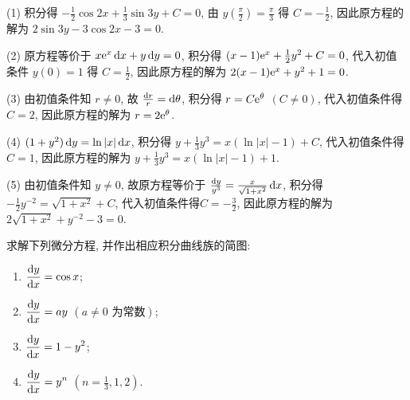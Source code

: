 \begin{solve}
  (1) 积分得 $-\frac{1}{2}\cos2x+\frac{1}{3}\sin3y+C=0$, 
  由 $y\left(\frac{\pi}{2}\right)=\frac{\pi}{3}$ 得 $C=-\frac{1}{2}$,
  因此原方程的解为 $2\sin3y-3\cos2x-3=0$.

  (2) 原方程等价于 $x\mathrm{e}^x\mathop{}\!\mathrm{d} x+y\mathop{}\!\mathrm{d} y=0$, 积分得 $(x-1)\mathrm{e}^x+\frac{1}{2}y^2+C=0$, 
  代入初值条件 $y(0)=1$ 得 $C=\frac{1}{2}$, 因此原方程的解为 $2(x-1)\mathrm{e}^x+y^2+1=0$.

  (3) 由初值条件知 $r\neq0$, 故 $\frac{\mathop{}\!\mathrm{d} r}{r}=\mathop{}\!\mathrm{d}\theta$, 积分得 $r=C\mathrm{e}^{\theta}$ $(C\neq 0)$,
  代入初值条件得 $C=2$, 因此原方程的解为 $r=2\mathrm{e}^{\theta}$.

  (4) $(1+y^2)\mathop{}\!\mathrm{d} y=\ln|x|\mathop{}\!\mathrm{d} x$, 积分得 $y+\frac{1}{3}y^3=x(\ln|x|-1)+C$, 
  代入初值条件得$C=1$, 因此原方程的解为 $y+\frac{1}{3}y^3=x(\ln|x|-1)+1$.

  (5) 由初值条件知 $y\neq0$, 故原方程等价于 $\frac{\mathop{}\!\mathrm{d} y}{y^3}=\frac{x}{\sqrt{1+x^2}}\mathop{}\!\mathrm{d} x$, 
  积分得 $-\frac{1}{2}y^{-2}=\sqrt{1+x^2}+C$, 代入初值条件得$C=-\frac{3}{2}$, 
  因此原方程的解为 $2\sqrt{1+x^2}+y^{-2}-3=0$.
\end{solve}



\begin{exercise}
  求解下列微分方程, 并作出相应积分曲线族的简图:
  \begin{enumerate}[(1)]
  \item $\displaystyle\frac{\mathop{}\!\mathrm{d} y}{\mathop{}\!\mathrm{d} x}=\cos x$;
  \item $\displaystyle\frac{\mathop{}\!\mathrm{d} y}{\mathop{}\!\mathrm{d} x}=ay$ $(a\neq 0\text{\ 为常数})$;
  \item $\displaystyle\frac{\mathop{}\!\mathrm{d} y}{\mathop{}\!\mathrm{d} x}=1-y^2$;
  \item $\displaystyle\frac{\mathop{}\!\mathrm{d} y}{\mathop{}\!\mathrm{d} x}=y^n$ $(n=\frac{1}{3},1,2)$.
  \end{enumerate}
\end{exercise}

